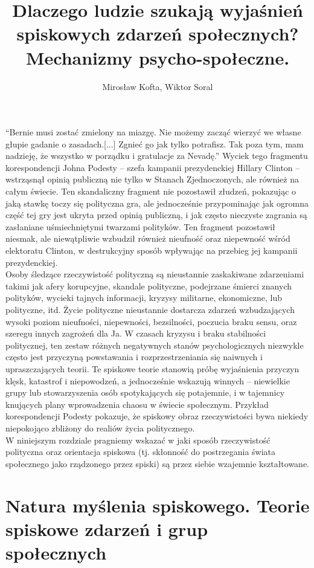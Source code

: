 \documentclass[man]{apa6}
\title{Dlaczego ludzie szukają wyjaśnień spiskowych zdarzeń społecznych? Mechanizmy psycho-społeczne.}
\author{Mirosław Kofta, Wiktor Soral}
\affiliation{Uniwersytet Warszawski}
\begin{document}
    \maketitle
    ``Bernie musi zostać zmielony na miazgę. Nie możemy zacząć wierzyć we własne głupie gadanie o zasadach.[...] Zgnieć go jak tylko potrafisz. Tak poza tym, mam nadzieję, że wszystko w porządku i gratulacje za Nevadę.'' Wyciek tego fragmentu korespondencji Johna Podesty -- szefa kampanii prezydenckiej Hillary Clinton -- wstrząsnął opinią publiczną nie tylko w Stanach Zjednoczonych, ale również na całym świecie. Ten skandaliczny fragment nie pozostawił złudzeń, pokazując o jaką stawkę toczy się polityczna gra, ale jednocześnie przypominając jak ogromna część tej gry jest ukryta przed opinią publiczną, i jak często nieczyste zagrania są zasłaniane uśmiechniętymi twarzami polityków. Ten fragment pozostawił niesmak, ale niewątpliwie wzbudził również nieufność oraz niepewność wśród elektoratu Clinton, w destrukcyjny sposób wpływając na przebieg jej kampanii prezydenckiej.\\

    Osoby śledzące rzeczywistość polityczną są nieustannie zaskakiwane zdarzeniami takimi jak afery korupcyjne, skandale polityczne, podejrzane śmierci znanych polityków, wycieki tajnych informacji, kryzysy militarne, ekonomiczne, lub polityczne, itd. Życie polityczne nieustannie dostarcza zdarzeń wzbudzających wysoki poziom nieufności, niepewności, bezsilności, poczucia braku sensu, oraz szeregu innych zagrożeń dla Ja. W czasach kryzysu i braku stabilności politycznej, ten zestaw różnych negatywnych stanów psychologicznych niezwykle często jest przyczyną powstawania i rozprzestrzeniania się naiwnych i upraszczających teorii. Te spiskowe teorie stanowią próbę wyjaśnienia przyczyn klęsk, katastrof i niepowodzeń, a jednocześnie wskazują winnych -- niewielkie grupy lub stowarzyszenia osób spotykających się potajemnie, i w tajemnicy knujących plany wprowadzenia chaosu w świecie społecznym. Przykład korespondencji Podesty pokazuje, że spiskowy obraz rzeczywistości bywa niekiedy niepokojąco zbliżony do realiów życia politycznego.\\

    W niniejszym rozdziale pragniemy wskazać w jaki sposób rzeczywistość polityczna oraz orientacja spiskowa (tj. skłonność do postrzegania świata społecznego jako rządzonego przez spiski) są przez siebie wzajemnie kształtowane. 

    \section{Natura myślenia spiskowego. Teorie spiskowe zdarzeń i grup społecznych}
\end{document}
